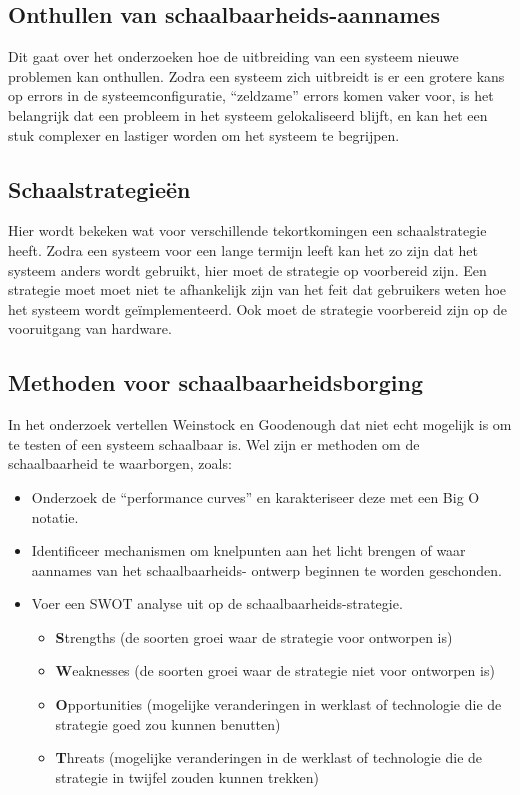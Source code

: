 \subsection{Onthullen van schaalbaarheids-aannames}
Dit gaat over het onderzoeken hoe de uitbreiding van een systeem nieuwe problemen kan onthullen. Zodra een systeem zich uitbreidt is er een grotere kans op errors in de systeemconfiguratie, \enquote{zeldzame} errors komen vaker voor, is het belangrijk dat een probleem in het systeem gelokaliseerd blijft, en kan het een stuk complexer en lastiger worden om het systeem te begrijpen.

\subsection{Schaalstrategieën}
Hier wordt bekeken wat voor verschillende tekortkomingen een schaalstrategie heeft. Zodra een systeem voor een lange termijn leeft kan het zo zijn dat het systeem anders wordt gebruikt, hier moet de strategie op voorbereid zijn. Een strategie moet moet niet te afhankelijk zijn van het feit dat gebruikers weten hoe het systeem wordt geïmplementeerd. Ook moet de strategie voorbereid zijn op de vooruitgang van hardware.

\subsection{Methoden voor schaalbaarheidsborging}
In het onderzoek vertellen Weinstock en Goodenough dat niet echt mogelijk is om te testen of een systeem schaalbaar is. Wel zijn er methoden om de schaalbaarheid te waarborgen, zoals:
\begin{itemize}
	\item Onderzoek de \enquote{performance curves} en karakteriseer deze met een Big O notatie.
	\item Identificeer mechanismen om knelpunten aan het licht brengen of waar aannames van het schaalbaarheids- ontwerp beginnen te worden geschonden.
	\item Voer een SWOT analyse uit op de schaalbaarheids-strategie.
	\begin{itemize}
		\item \textbf{S}trengths (de soorten groei waar de strategie voor ontworpen is)
		\item \textbf{W}eaknesses (de soorten groei waar de strategie niet voor ontworpen is)
		\item \textbf{O}pportunities (mogelijke veranderingen in werklast of technologie die de strategie goed zou kunnen benutten)
		\item \textbf{T}hreats (mogelijke veranderingen in de werklast of technologie die de strategie in twijfel zouden kunnen trekken)
	\end{itemize}
\end{itemize}

